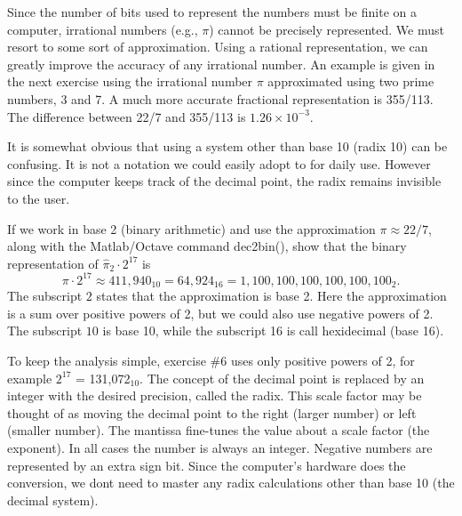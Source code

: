 \documentclass{ximera}
\begin{document}
Since the number of bits used to represent the numbers must be finite on a computer, irrational numbers (e.g., $\pi$) cannot be precisely represented.
We must resort to some sort of approximation.
Using a rational representation, we can greatly improve the accuracy of any irrational number.
An example is given in the next exercise using the irrational number $\pi$ approximated using two prime numbers, 3 and 7.
A much more accurate fractional representation is 355/113. The difference between 22/7 and 355/113 is $1.26\!\times\!\!10^{-3}$.

It is somewhat obvious that using a system other than base 10 (radix 10) can be confusing.
It is not a notation we could easily adopt to for daily use.
However since the computer keeps track of the decimal point, the radix remains invisible to the user.

\BEx %
If we work in base 2 (binary arithmetic) and use the approximation $\pi \approx 22/7$, along with the Matlab/Octave command
{\sc dec2bin()}, show that the binary representation of $\hat{\pi}_2 \cdot 2^{17}$ is
\[
 \pi \cdot 2^{17} \approx 411,940_{10} = 64,924_{16}
 =
1,100,100,100,100,100,100_2.
\]
The subscript $2$ states that the approximation is base 2.
Here the approximation is a sum over positive powers of 2, but we could also use negative powers of 2.
The subscript $10$ is base 10, while the subscript 16 is call hexidecimal (base 16). 

\EEx


To keep the analysis simple, exercise \#6 uses only positive powers of 2, for example
 $2^{17}$ = 131,072$_{10}$.
The concept of the decimal point is replaced by an integer with the desired precision, called the radix.
This scale factor may be thought of as moving the decimal point to the right (larger number)
or left (smaller number).
The mantissa fine-tunes the value about a scale factor (the exponent).
In all cases the number is always an integer.
Negative numbers are represented by an extra sign bit.
Since the computer's hardware does the conversion, we dont need to master any radix calculations other than base 10 (the decimal system).
\end{document}
